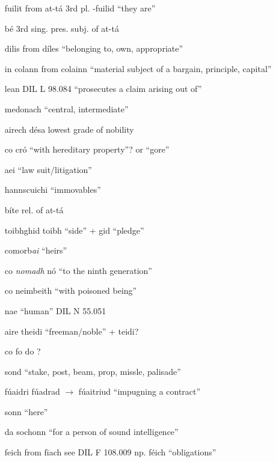 \documentclass[11pt]{article}
\begin{document}
\begin{enumerate}
  \item[fuilit] from at-t\'{a} 3rd pl. -fuilid \enquote{they are}
  \item[b\'{e}] 3rd sing. pres. subj. of at-t\'{a}
  \item[dilis] from d\'{i}les \enquote{belonging to, own, appropriate}
  \item[in colann] from colainn \enquote{material subject of a bargain, principle, capital}
  \item[lean] DIL L 98.084 \enquote{prosecutes a claim arising out of}
  \item[medonach] \enquote{central, intermediate}
  \item[airech d\'{e}sa] lowest grade of nobility
  \item[co cr\'{o}] \enquote{with hereditary property}? or \enquote{gore}
  \item[aei] \enquote{law suit/litigation}
  \item[hannscuichi] \enquote{immovables}
  \item[b\'{i}te] rel. of at-t\'{a}
  \item[toibhghid] toibh \enquote{side} + gid \enquote{pledge}
  \item[comorb\emph{ai}] \enquote{heirs}
  \item[co \emph{nomadh} n\'{o}] \enquote{to the ninth generation}
  \item[co neimbeith] \enquote{with poisoned being}
  \item[nae] \enquote{human} DIL N 55.051
  \item[aire theidi] \enquote{freeman/noble} + teidi?
  \item[co fo do] ?
  \item[sond] \enquote{stake, post, beam, prop, missle, palisade}
  \item[f\'{u}aidri] f\'{u}adrad $\rightarrow$ f\'{u}aitriud \enquote{impugning a contract}
  \item[sonn] \enquote{here}
  \item[da sochonn] \enquote{for a person of sound intelligence} 
  \item[feich] from f\={i}ach see DIL F 108.009 np. féich \enquote{obligations}
\end{enumerate}
\end{document}
